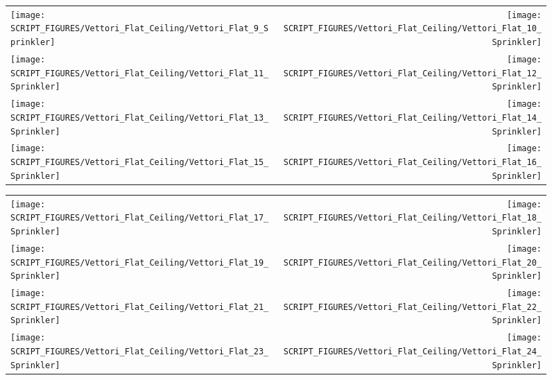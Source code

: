 \begin{figure}[!ht]
\begin{tabular*}{\textwidth}{l@{\extracolsep{\fill}}r}
\texttt{[image: SCRIPT\_FIGURES/Vettori\_Flat\_Ceiling/Vettori\_Flat\_9\_Sprinkler]} &
\texttt{[image: SCRIPT\_FIGURES/Vettori\_Flat\_Ceiling/Vettori\_Flat\_10\_Sprinkler]} \\
\texttt{[image: SCRIPT\_FIGURES/Vettori\_Flat\_Ceiling/Vettori\_Flat\_11\_Sprinkler]} &
\texttt{[image: SCRIPT\_FIGURES/Vettori\_Flat\_Ceiling/Vettori\_Flat\_12\_Sprinkler]} \\
\texttt{[image: SCRIPT\_FIGURES/Vettori\_Flat\_Ceiling/Vettori\_Flat\_13\_Sprinkler]} &
\texttt{[image: SCRIPT\_FIGURES/Vettori\_Flat\_Ceiling/Vettori\_Flat\_14\_Sprinkler]} \\
\texttt{[image: SCRIPT\_FIGURES/Vettori\_Flat\_Ceiling/Vettori\_Flat\_15\_Sprinkler]} &
\texttt{[image: SCRIPT\_FIGURES/Vettori\_Flat\_Ceiling/Vettori\_Flat\_16\_Sprinkler]}
\end{tabular*}
\end{figure}

\begin{figure}[!ht]
\begin{tabular*}{\textwidth}{l@{\extracolsep{\fill}}r}
\texttt{[image: SCRIPT\_FIGURES/Vettori\_Flat\_Ceiling/Vettori\_Flat\_17\_Sprinkler]} &
\texttt{[image: SCRIPT\_FIGURES/Vettori\_Flat\_Ceiling/Vettori\_Flat\_18\_Sprinkler]} \\
\texttt{[image: SCRIPT\_FIGURES/Vettori\_Flat\_Ceiling/Vettori\_Flat\_19\_Sprinkler]} &
\texttt{[image: SCRIPT\_FIGURES/Vettori\_Flat\_Ceiling/Vettori\_Flat\_20\_Sprinkler]} \\
\texttt{[image: SCRIPT\_FIGURES/Vettori\_Flat\_Ceiling/Vettori\_Flat\_21\_Sprinkler]} &
\texttt{[image: SCRIPT\_FIGURES/Vettori\_Flat\_Ceiling/Vettori\_Flat\_22\_Sprinkler]} \\
\texttt{[image: SCRIPT\_FIGURES/Vettori\_Flat\_Ceiling/Vettori\_Flat\_23\_Sprinkler]} &
\texttt{[image: SCRIPT\_FIGURES/Vettori\_Flat\_Ceiling/Vettori\_Flat\_24\_Sprinkler]}
\end{tabular*}
\end{figure}


